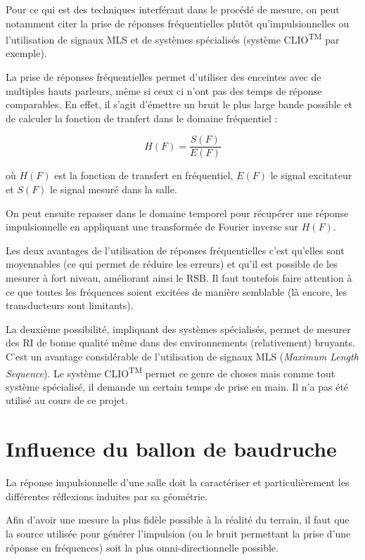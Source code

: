 Pour ce qui est des techniques interférant dans le procédé de mesure, on peut notamment citer la prise de réponses
fréquentielles plutôt qu'impulsionnelles ou l'utilisation de signaux MLS et de systèmes spécialisés (système CLIO\textsuperscript{\textsc{TM}} par
exemple).

La prise de réponses fréquentielles permet d'utiliser des enceintes avec de multiples hauts parleurs, même si ceux ci
n'ont pas des temps de réponse comparables. En effet, il s'agit d'émettre un bruit le plus large bande possible et de
calculer la fonction de tranfert dans le domaine fréquentiel :

$$H(F) = \frac{S(F)}{E(F)}$$

où $H(F)$ est la fonction de transfert en fréquentiel, $E(F)$ le signal excitateur et $S(F)$ le signal mesuré dans la
salle.

On peut ensuite repasser dans le domaine temporel pour récupérer une réponse impulsionnelle en appliquant une transformée
de Fourier inverse sur $H(F)$.

Les deux avantages de l'utilisation de réponses fréquentielles c'est qu'elles sont moyennables (ce qui permet de réduire
les erreurs) et qu'il est possible de les mesurer à fort niveau, améliorant ainsi le RSB. Il faut toutefois faire
attention à ce que toutes les fréquences soient excitées de manière semblable (là encore, les transducteurs sont
limitants).

La deuxième possibilité, impliquant des systèmes spécialisés, permet de mesurer des RI de bonne qualité même dans des
environnements (relativement) bruyants. C'est un avantage considérable de l'utilisation de signaux MLS (\textit{Maximum
Length Sequence}). Le système CLIO\textsuperscript{\textsc{TM}} permet ce genre de choses mais comme tout système
spécialisé, il demande un certain temps de prise en main. Il n'a pas été utilisé au cours de ce projet.

\section{Influence du ballon de baudruche} %

La réponse impulsionnelle d'une salle doit la caractériser et particulièrement les différentes réflexions induites
par sa géométrie.

Afin d'avoir une mesure la plus fidèle possible à la réalité du terrain, il faut que la source utilisée pour générer
l'impulsion (ou le bruit permettant la prise d'une réponse en fréquences) soit la plus omni-directionnelle possible.

